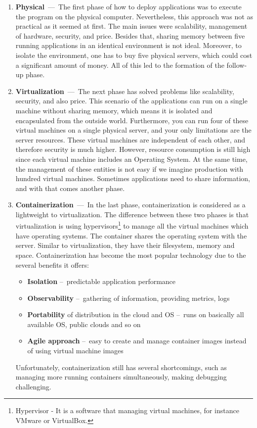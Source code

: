 \begin{enumerate}
    \item \textbf{Physical} \,---\, The first phase of how to deploy applications was to execute the program on the physical computer. Nevertheless, this approach was not as practical as it seemed at first. The main issues were scalability, management of hardware, security, and price. Besides that, sharing memory between five running applications in an identical environment is not ideal. Moreover, to isolate the environment, one has to buy five physical servers, which could cost a significant amount of money. All of this led to the formation of the follow-up phase.
    
    \item \textbf{Virtualization} \,---\, The next phase has solved problems like scalability, security, and also price. This scenario of the applications can run on a single machine without sharing memory, which means it is isolated and encapsulated from the outside world. Furthermore, you can run four of these virtual machines on a single physical server, and your only limitations are the server resources. These virtual machines are independent of each other, and therefore security is much higher. However, resource consumption is still high since each virtual machine includes an Operating System. At the same time, the management of these entities is not easy if we imagine production with hundred virtual machines. Sometimes applications need to share information, and with that comes another phase. 
    
    \item \textbf{Containerization} \,---\, In the last phase, containerization is considered as a lightweight to virtualization. The difference between these two phases is that virtualization is using hypervisors\footnote{Hypervisor - It is a software that managing virtual machines, for instance VMware or VirtualBox.} to manage all the virtual machines which have operating systems. The container shares the operating system with the server. Similar to virtualization, they have their filesystem, memory and space. Containerization has become the most popular technology due to the several benefits it offers: 
        \begin{itemize}[itemsep=1mm, parsep=0pt]
            \item \textbf{Isolation} \---\ predictable application performance
            \item \textbf{Observability} \---\ gathering of information, providing metrics, logs
            \item \textbf{Portability} of distribution in the cloud and OS \---\ runs on basically all available OS, public clouds and so on
            \item \textbf{Agile approach} \---\ easy to create and manage container images instead of using virtual machine images
        \end{itemize}
    Unfortunately, containerization still has several shortcomings, such as managing more running containers  simultaneously, making debugging challenging.
    

\end{enumerate}

